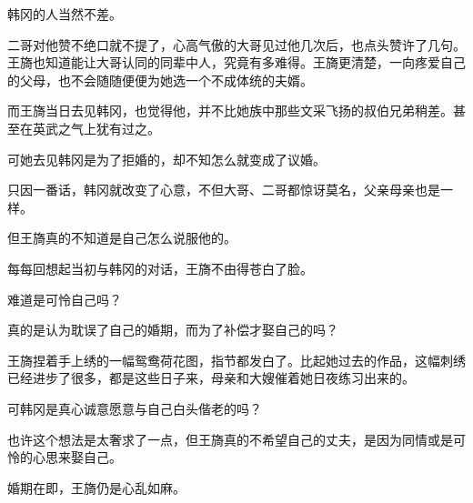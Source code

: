 韩冈的人当然不差。

二哥对他赞不绝口就不提了，心高气傲的大哥见过他几次后，也点头赞许了几句。王旖也知道能让大哥认同的同辈中人，究竟有多难得。王旖更清楚，一向疼爱自己的父母，也不会随随便便为她选一个不成体统的夫婿。

而王旖当日去见韩冈，也觉得他，并不比她族中那些文采飞扬的叔伯兄弟稍差。甚至在英武之气上犹有过之。

可她去见韩冈是为了拒婚的，却不知怎么就变成了议婚。

只因一番话，韩冈就改变了心意，不但大哥、二哥都惊讶莫名，父亲母亲也是一样。

但王旖真的不知道是自己怎么说服他的。

每每回想起当初与韩冈的对话，王旖不由得苍白了脸。

难道是可怜自己吗？

真的是认为耽误了自己的婚期，而为了补偿才娶自己的吗？

王旖捏着手上绣的一幅鸳鸯荷花图，指节都发白了。比起她过去的作品，这幅刺绣已经进步了很多，都是这些日子来，母亲和大嫂催着她日夜练习出来的。

可韩冈是真心诚意愿意与自己白头偕老的吗？

也许这个想法是太奢求了一点，但王旖真的不希望自己的丈夫，是因为同情或是可怜的心思来娶自己。

婚期在即，王旖仍是心乱如麻。

